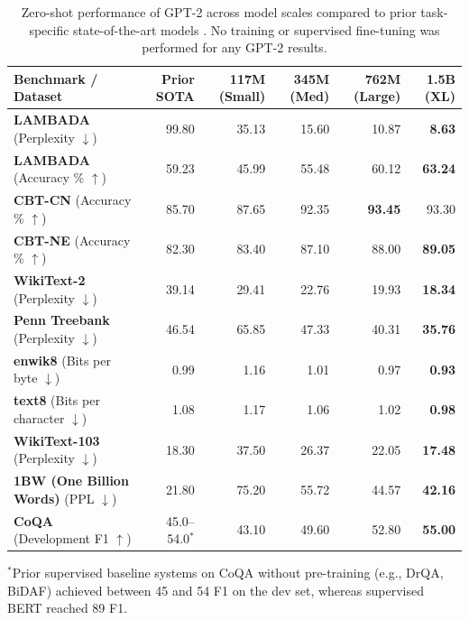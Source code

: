 \documentclass[../../main.tex]{subfiles}
\begin{document}
\begin{table}[t]
\centering
\small
\caption{Zero-shot performance of GPT-2 across model scales compared to prior task-specific state-of-the-art models \cite{radford2019}. No training or supervised fine-tuning was performed for any GPT-2 results.}
\label{tab:gpt2_zero_shot}
\begin{tabularx}{\textwidth}{l r r r r r}
\toprule
\textbf{Benchmark / Dataset} & \textbf{Prior SOTA} & \textbf{117M (Small)} & \textbf{345M (Med)} & \textbf{762M (Large)} & \textbf{1.5B (XL)} \\
\midrule
\textbf{LAMBADA} (Perplexity $\downarrow$) & 99.80 & 35.13 & 15.60 & 10.87 & \textbf{8.63} \\
\textbf{LAMBADA} (Accuracy \% $\uparrow$) & 59.23 & 45.99 & 55.48 & 60.12 & \textbf{63.24} \\
\textbf{CBT-CN} (Accuracy \% $\uparrow$) & 85.70 & 87.65 & 92.35 & \textbf{93.45} & 93.30 \\
\textbf{CBT-NE} (Accuracy \% $\uparrow$) & 82.30 & 83.40 & 87.10 & 88.00 & \textbf{89.05} \\
\textbf{WikiText-2} (Perplexity $\downarrow$) & 39.14 & 29.41 & 22.76 & 19.93 & \textbf{18.34} \\
\textbf{Penn Treebank} (Perplexity $\downarrow$) & 46.54 & 65.85 & 47.33 & 40.31 & \textbf{35.76} \\
\textbf{enwik8} (Bits per byte $\downarrow$) & 0.99 & 1.16 & 1.01 & 0.97 & \textbf{0.93} \\
\textbf{text8} (Bits per character $\downarrow$) & 1.08 & 1.17 & 1.06 & 1.02 & \textbf{0.98} \\
\textbf{WikiText-103} (Perplexity $\downarrow$) & 18.30 & 37.50 & 26.37 & 22.05 & \textbf{17.48} \\
\textbf{1BW (One Billion Words)} (PPL $\downarrow$) & 21.80 & 75.20 & 55.72 & 44.57 & \textbf{42.16} \\
\midrule
\textbf{CoQA} (Development F1 $\uparrow$) & 45.0--54.0$^*$ & 43.10 & 49.60 & 52.80 & \textbf{55.00} \\
\bottomrule
\end{tabularx}
\begin{flushleft}
\footnotesize $^*$Prior supervised baseline systems on CoQA without pre-training (e.g., DrQA, BiDAF) achieved between 45 and 54 F1 on the dev set, whereas supervised BERT reached 89 F1.
\end{flushleft}
\end{table}
\end{document}
